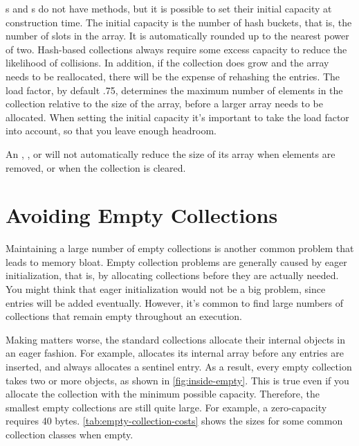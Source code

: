 s and s do not have 
methods, but it is possible to set their initial capacity at construction time.
The initial capacity is the number of hash buckets, that is, the number of slots
in the array. It is automatically rounded up to the nearest power of
two. Hash-based collections always require some excess capacity to reduce the
likelihood of collisions. In addition, if the collection does grow and the
array needs to be reallocated, there will be the expense of
rehashing the entries. The load factor, by default .75, determines the
maximum number of elements in the collection relative to the size of the array,
before a larger array needs to be allocated. When setting the initial
capacity it's important to take the load factor into account, so that you leave enough headroom.

An , , or 
will not automatically reduce the size of its array when elements are removed,
or when the collection is cleared.

  

\section{Avoiding Empty Collections}

Maintaining a large number of empty collections is another common problem that
leads to memory bloat. Empty collection problems are generally caused by eager
initialization, that is, by allocating collections before they are actually
needed. You might think that eager initialization would not be a big
problem, since entries will be added eventually. However, it's common to
find large numbers of collections that remain empty throughout an execution.

Making matters worse, the standard collections
allocate their internal objects in an eager fashion. For example,
 allocates its internal array before any
entries are inserted, and  always allocates a sentinel
entry. As a result, every empty collection takes two or more objects, as shown
in \autoref{fig:inside-empty}.
This is true even if you allocate the collection with the minimum possible
capacity.
Therefore, the smallest empty collections are still quite large. For example,
a zero-capacity  requires 40 bytes.
\autoref{tab:empty-collection-costs} shows the sizes for some common collection classes
when empty. 

